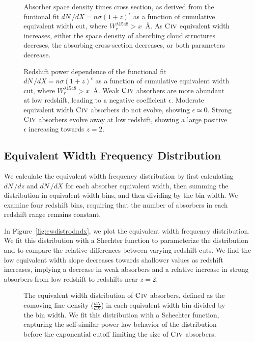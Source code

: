 \documentclass[linenumbers,twocolumn]{aastex61}
\begin{document}
\begin{figure}[bth]
\caption{Absorber space density times cross section, as derived from the funtional fit $dN\,/dX = n\sigma (1 + z)^{\epsilon}$ as a function of cumulative equivalent width cut, where $W_r^{\lambda1548} > x$~{\AA}. As ${\hbox{{\rm C}\kern 0.1em{\sc iv}}}$ equivalent width increases, either the space density of absorbing cloud structures decreses, the absorbing cross-section decreases, or both parameters decrease.}
\label{fig:nsigma}
\end{figure}

\begin{figure}[bth]
\caption{Redshift power dependence of the functional fit $dN\,/dX = n\sigma (1 + z)^{\epsilon}$ as a function of cumulative equivalent width cut, where $W_r^{\lambda1548} > x$~{\AA}. Weak ${\hbox{{\rm C}\kern 0.1em{\sc iv}}}$ absorbers are more abundant at low redshift, leading to a negative coefficient $\epsilon$. Moderate equivalent width ${\hbox{{\rm C}\kern 0.1em{\sc iv}}}$ absorbers do not evolve, showing $\epsilon \simeq 0$. Strong ${\hbox{{\rm C}\kern 0.1em{\sc iv}}}$ absorbers evolve away at low redshift, showing a large positive $\epsilon$ increasing towards $z = 2$.}
\label{fig:epsilon}
\end{figure}

\subsection{Equivalent Width Frequency Distribution}
\label{sec:ewdistro}

We calculate the equivalent width frequency distribution by first calculating $dN\,/dz$ and $dN\,/dX$ for each absorber equivalent width, then summing the distribution in equivalent width bins, and then dividing by the bin width. We examine four redshift bins, requiring that the number of absorbers in each redshift range remains constant.

In Figure~\ref{fig:ewdistrodndx}, we plot the equivalent width frequency distribution. We fit this distribution with a Shechter function to parameterize the distribution and to compare the relative differences between varying redshift cuts. We find the low equivalent width slope decreases towards shallower values as redshift increases, implying a decrease in weak {\CIV} absorbers and a relative increase in strong {\CIV} absorbers from low redshift to redshifts near $z = 2$.

\begin{figure*}[bth]
\caption{The equivalent width distribution of ${\hbox{{\rm C}\kern 0.1em{\sc iv}}}$ absorbers, defined as the comoving line density ($\frac{dN}{dX}$) in each equivalent width bin divided by the bin width. We fit this distribution with a Schechter function, capturing the self-similar power law behavior of the distribution before the exponential cutoff limiting the size of ${\hbox{{\rm C}\kern 0.1em{\sc iv}}}$ absorbers.}
\label{fig:ewdistrodndz}
\end{figure*}
\end{document}
